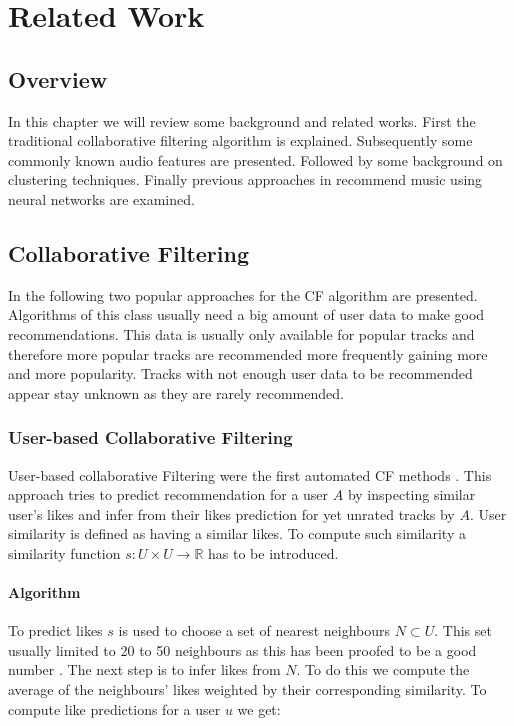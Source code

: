 \documentclass[cic,tc,english]{iiufrgs}
\begin{document}

\chapter{Related Work}

\section{Overview}
In this chapter we will review some background and related works. First the traditional collaborative filtering algorithm is explained. Subsequently some commonly known audio features are presented. Followed by some background on clustering techniques. Finally previous approaches in recommend music using neural networks are examined.

\section{Collaborative Filtering}
In the following two popular approaches for the CF algorithm are presented. Algorithms of this class usually need a big amount of user data to make good recommendations. This data is usually only available for popular tracks and therefore more popular tracks are recommended more frequently gaining more and more popularity. Tracks with not enough user data to be recommended appear stay unknown as they are rarely recommended. 

\subsection{User-based Collaborative Filtering}
User-based collaborative Filtering were the first automated CF methods \cite{ekstrand2011collaborative}. This approach tries to predict recommendation for a user $A$ by inspecting similar user's likes and infer from their likes prediction for yet unrated tracks by $A$. User similarity is defined as having a similar likes. To compute such similarity a similarity function $s:U \times U \rightarrow \mathbb{R}$ has to be introduced.

\subsubsection{Algorithm}
To predict likes $s$ is used to choose a set of nearest neighbours $N \subset U$. This set usually limited to 20 to 50 neighbours as this has been proofed to be a good number \cite{herlocker2002empirical}. The next step is to infer likes from $N$. To do this we compute the average of the neighbours' likes weighted by their corresponding similarity. To compute like predictions for a user $u$ we get:
\end{document}

